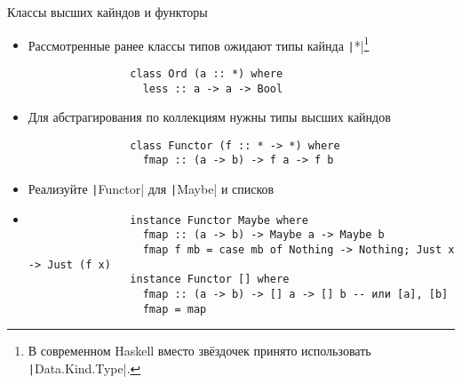 
    \begin{frame}[fragile]{Классы высших кайндов и функторы}
        \begin{itemize}
            \item Рассмотренные ранее классы типов ожидают типы кайнда \texttt|*|\footnote{В современном Haskell вместо звёздочек принято использовать \texttt|Data.Kind.Type|.} %
            \begin{verbatim}
                class Ord (a :: *) where
                  less :: a -> a -> Bool
            \end{verbatim}
            \item Для абстрагирования по коллекциям нужны типы высших кайндов
            \begin{verbatim}
                class Functor (f :: * -> *) where
                  fmap :: (a -> b) -> f a -> f b
            \end{verbatim}
            \item[\todo] Реализуйте \texttt|Functor| для \texttt|Maybe| и списков %
            \item[\answer] \pause
            \begin{verbatim}
                instance Functor Maybe where
                  fmap :: (a -> b) -> Maybe a -> Maybe b
                  fmap f mb = case mb of Nothing -> Nothing; Just x -> Just (f x)
                instance Functor [] where
                  fmap :: (a -> b) -> [] a -> [] b -- или [a], [b]
                  fmap = map
            \end{verbatim}
        \end{itemize}
    \end{frame}

